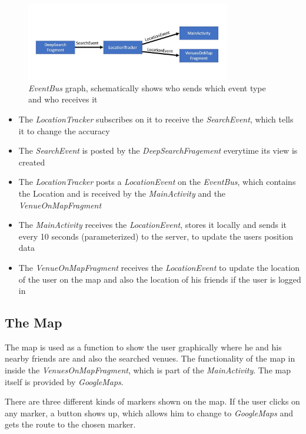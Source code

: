 \begin{figure}[htbp]
	\includegraphics[width=0.8\textwidth]{images/eventBus.jpg}
	\centering
	\caption[]{\textit{EventBus} graph, schematically shows who sends which event type and who receives it}
	\label{fig:eventbus}
\end{figure} 


\begin{itemize}
\item The \textit{LocationTracker} subscribes on it to receive the \textit{SearchEvent}, which tells it to change the accuracy
\item The \textit{SearchEvent} is posted by the \textit{DeepSearchFragement} everytime its view is created
\item The \textit{LocationTracker} posts a \textit{LocationEvent} on the \textit{EventBus}, which contains the Location and is received by the \textit{MainActivity} and the \textit{VenueOnMapFragment}
\item The \textit{MainActivity} receives the \textit{LocationEvent}, stores it locally and sends it every 10 seconds (parameterized) to the server, to update the users position data
\item The \textit{VenueOnMapFragment} receives the \textit{LocationEvent} to update the location of the user on the map and also the location of his friends if the user is logged in
\end{itemize}

\subsection{The Map}
The map is used as a function to show the user graphically where he and his nearby friends are and also the searched venues. The functionality of the map in inside the \textit{VenuesOnMapFragment}, which is part of the \textit{MainActivity}. The map itself is provided by \textit{GoogleMaps}.

There are three different kinds of markers shown on the map. If the user clicks on any marker, a button shows up, which allows him to change to \textit{GoogleMaps} and gets the route to the chosen marker. 

